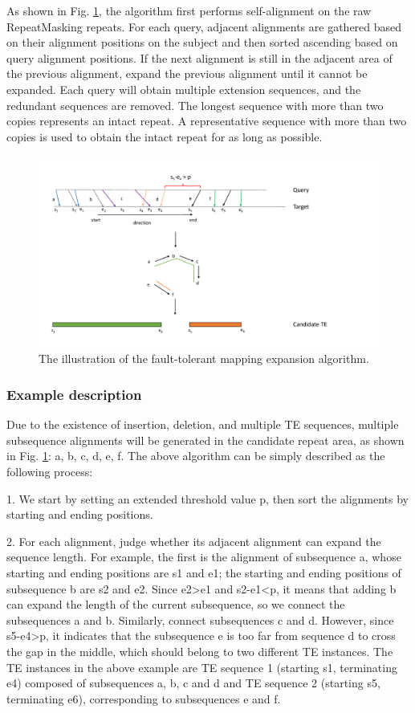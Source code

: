 \documentclass{bmcart}
\begin{document}
As shown in Fig. \ref{fig:fmea}, the algorithm first performs self-alignment on the raw RepeatMasking repeats. For each query, adjacent alignments are gathered based on their alignment positions on the subject and then sorted ascending based on query alignment positions. If the next alignment is still in the adjacent area of the previous alignment, expand the previous alignment until it cannot be expanded. Each query will obtain multiple extension sequences, and the redundant sequences are removed. The longest sequence with more than two copies represents an intact repeat. A representative sequence with more than two copies is used to obtain the intact repeat for as long as possible.

\begin{figure}[h!]
	\centerline{\includegraphics[width=1.0\textwidth]{figures/FMEA.pdf}}
	\caption{The illustration of the fault-tolerant mapping expansion algorithm.}
	\label{fig:fmea}
\end{figure}

\subsubsection*{Example description}
Due to the existence of insertion, deletion, and multiple TE sequences, multiple subsequence alignments will be generated in the candidate repeat area, as shown in Fig. \ref{fig:fmea}: a, b, c, d, e, f. The above algorithm can be simply described as the following process:

1. We start by setting an extended threshold value p, then sort the alignments by starting and ending positions.

2. For each alignment, judge whether its adjacent alignment can expand the sequence length. For example, the first is the alignment of subsequence a, whose starting and ending positions are s1 and e1; the starting and ending positions of subsequence b are s2 and e2. Since e2>e1 and s2-e1<p, it means that adding b can expand the length of the current subsequence, so we connect the subsequences a and b. Similarly, connect subsequences c and d. However, since s5-e4>p, it indicates that the subsequence e is too far from sequence d to cross the gap in the middle, which should belong to two different TE instances. The TE instances in the above example are TE sequence 1 (starting s1, terminating e4) composed of subsequences a, b, c and d and TE sequence 2 (starting s5, terminating e6), corresponding to subsequences e and f.
\end{document}
